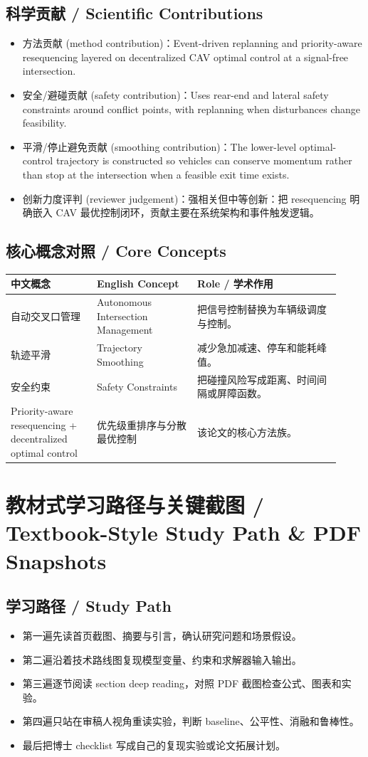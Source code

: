 \documentclass[UTF8,a4paper,11pt,fontset=fandol]{ctexart}
\begin{document}
\subsection{科学贡献 / Scientific Contributions}
\begin{itemize}
\item 方法贡献 (method contribution)：Event-driven replanning and priority-aware resequencing layered on decentralized CAV optimal control at a signal-free intersection.
\item 安全/避碰贡献 (safety contribution)：Uses rear-end and lateral safety constraints around conflict points, with replanning when disturbances change feasibility.
\item 平滑/停止避免贡献 (smoothing contribution)：The lower-level optimal-control trajectory is constructed so vehicles can conserve momentum rather than stop at the intersection when a feasible exit time exists.
\item 创新力度评判 (reviewer judgement)：强相关但中等创新：把 resequencing 明确嵌入 CAV 最优控制闭环，贡献主要在系统架构和事件触发逻辑。
\end{itemize}


\subsection{核心概念对照 / Core Concepts}
\begin{longtable}{p{0.24\linewidth}p{0.28\linewidth}p{0.40\linewidth}}
\toprule
中文概念 & English Concept & Role / 学术作用\\
\midrule
自动交叉口管理 & Autonomous Intersection Management & 把信号控制替换为车辆级调度与控制。 \\
轨迹平滑 & Trajectory Smoothing & 减少急加减速、停车和能耗峰值。 \\
安全约束 & Safety Constraints & 把碰撞风险写成距离、时间间隔或屏障函数。 \\
Priority-aware resequencing + decentralized optimal control & 优先级重排序与分散最优控制 & 该论文的核心方法族。 \\
\bottomrule
\end{longtable}

\section{教材式学习路径与关键截图 / Textbook-Style Study Path \& PDF Snapshots}
\subsection{学习路径 / Study Path}
\begin{itemize}
\item 第一遍先读首页截图、摘要与引言，确认研究问题和场景假设。
\item 第二遍沿着技术路线图复现模型变量、约束和求解器输入输出。
\item 第三遍逐节阅读 section deep reading，对照 PDF 截图检查公式、图表和实验。
\item 第四遍只站在审稿人视角重读实验，判断 baseline、公平性、消融和鲁棒性。
\item 最后把博士 checklist 写成自己的复现实验或论文拓展计划。
\end{itemize}
\end{document}
